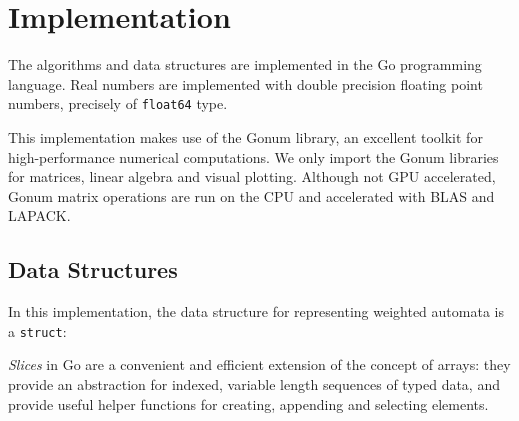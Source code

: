 \section{Implementation}
\label{sec:impl}

The algorithms and data structures are implemented in the Go programming 
language. Real numbers are implemented with double precision floating point numbers,  
precisely of \texttt{float64} type.

This implementation makes use of the Gonum library, 
an excellent toolkit for high-performance numerical computations.
We only import the Gonum libraries for matrices, linear algebra 
and visual plotting.
Although not GPU accelerated, Gonum matrix operations are run on 
the CPU and accelerated with BLAS and LAPACK.


\subsection{Data Structures}
In this implementation, the data structure for representing weighted automata is a \texttt{struct}:



\begin{note}
    \textit{Slices} in Go are a convenient and efficient extension of the concept of arrays: 
    they provide an abstraction for indexed, variable length sequences of typed data, and 
    provide useful helper functions for creating, appending and selecting elements. 
\end{note}

